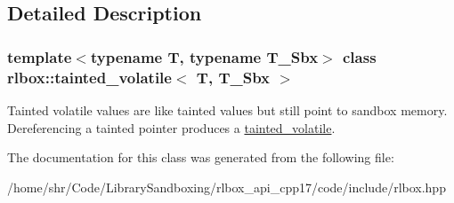 \subsection{Detailed Description}
\subsubsection*{template$<$typename T, typename T\+\_\+\+Sbx$>$\newline
class rlbox\+::tainted\+\_\+volatile$<$ T, T\+\_\+\+Sbx $>$}

Tainted volatile values are like tainted values but still point to sandbox memory. Dereferencing a tainted pointer produces a \hyperlink{classrlbox_1_1tainted__volatile}{tainted\+\_\+volatile}. 

The documentation for this class was generated from the following file\+:\begin{DoxyCompactItemize}
\item 
/home/shr/\+Code/\+Library\+Sandboxing/rlbox\+\_\+api\+\_\+cpp17/code/include/rlbox.\+hpp\end{DoxyCompactItemize}

